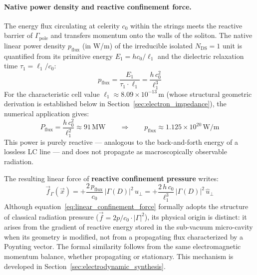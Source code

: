 \documentclass[11pt,a4paper]{article}
\theoremstyle{plain}
\theoremstyle{remark}
\newcommand{\Ncd}{\ensuremath{N_{\mathrm{DS}}}}
\begin{document}
\paragraph{Native power density and reactive confinement force.}
The energy flux circulating at celerity $c_0$ within the strings meets the reactive barrier of $\Gamma_{\text{pole}}$ and transfers momentum onto the walls of the soliton. The native linear power density $p_{\text{flux}}$ (in W/m) of the irreducible isolated $\Ncd=1$ unit is quantified from its primitive energy $E_1 = hc_0/\ell_1$ and the dielectric relaxation time $\tau_1 = \ell_1/c_0$:
\begin{equation}\label{eq:p_flux}
p_{\text{flux}} =
\frac{E_1}{\tau_1 \cdot \ell_1} = \frac{h\,c_0^2}{\ell_1^3}
\end{equation}
For the characteristic cell value $\ell_1 \approx 8.09 \times 10^{-13}$\,m (whose structural geometric derivation is established below in Section~\ref{sec:electron_impedance}), the numerical application gives:
\begin{equation}
P_{\text{flux}} = \frac{h\,c_0^2}{\ell_1^2} \approx 91\,\text{MW}
\qquad \Longrightarrow \qquad
p_{\text{flux}} \approx 1.125 \times 10^{20}\,\text{W/m}
\end{equation}
This power is purely reactive --- analogous to the back-and-forth energy of a lossless LC line --- and does not propagate as macroscopically observable radiation.

The resulting linear force of \textbf{reactive confinement pressure} writes:
\begin{equation}\label{eq:linear_confinement_force}
\vec{f}_{\Gamma}(\vec{x}) =
+\frac{2\,p_{\text{flux}}}{c_0}\,|\Gamma(D)|^2\,\hat{u}_{\perp} =
+\frac{2\,h\,c_0}{\ell_1^3}\,|\Gamma(D)|^2\,\hat{u}_{\perp}
\end{equation}
Although equation~\eqref{eq:linear_confinement_force} formally adopts the structure of classical radiation pressure ($\vec{f} = 2p/c_0 \cdot |\Gamma|^2$), its physical origin is distinct: it arises from the gradient of reactive energy stored in the sub-vacuum micro-cavity when its geometry is modified, not from a propagating flux characterized by a Poynting vector. The formal similarity follows from the same electromagnetic momentum balance, whether propagating or stationary. This mechanism is developed in Section~\ref{sec:electrodynamic_synthesis}.
\end{document}
